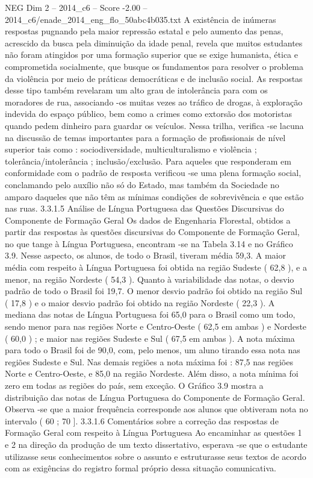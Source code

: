 \begin{textsample}{NEG Dim 2 – 2014\_c6 – Score -2.00 – 2014\_c6/enade\_2014\_eng\_flo\_50abc4b035.txt}
A existência de inúmeras respostas pugnando pela maior repressão estatal e pelo aumento das penas, acrescido da busca pela diminuição da idade penal, revela que muitos estudantes não foram atingidos por uma formação superior que se exige humanista, ética e comprometida socialmente, que busque os fundamentos para resolver o problema da violência por meio de práticas democráticas e de inclusão social.
As respostas desse tipo também revelaram um alto grau de intolerância para com os moradores de rua, associando -os muitas vezes ao tráfico de drogas, à exploração indevida do espaço público, bem como a crimes como extorsão dos motoristas quando pedem dinheiro para guardar os veículos.
Nessa trilha, verifica -se lacuna na discussão de temas importantes para a formação de profissionais de nível superior tais como : sociodiversidade, multiculturalismo e violência ; tolerância/intolerância ; inclusão/exclusão.
Para aqueles que responderam em conformidade com o padrão de resposta verificou -se uma plena formação social, conclamando pelo auxílio não só do Estado, mas também da Sociedade no amparo daqueles que não têm as mínimas condições de sobrevivência e que estão nas ruas. 3.3.1.5 Análise de Língua Portuguesa das Questões Discursivas do Componente de Formação Geral Os dados de Engenharia Florestal, obtidos a partir das respostas às questões discursivas do Componente de Formação Geral, no que tange à Língua Portuguesa, encontram -se na Tabela 3.14 e no Gráfico 3.9.
Nesse aspecto, os alunos, de todo o Brasil, tiveram média 59,3.
A maior média com respeito à Língua Portuguesa foi obtida na região Sudeste ( 62,8 ), e a menor, na região Nordeste ( 54,3 ).
Quanto à variabilidade das notas, o desvio padrão de todo o Brasil foi 19,7.
O menor desvio padrão foi obtido na região Sul ( 17,8 ) e o maior desvio padrão foi obtido na região Nordeste ( 22,3 ).
A mediana das notas de Língua Portuguesa foi 65,0 para o Brasil como um todo, sendo menor para nas regiões Norte e Centro-Oeste ( 62,5 em ambas ) e Nordeste ( 60,0 ) ; e maior nas regiões Sudeste e Sul ( 67,5 em ambas ).
A nota máxima para todo o Brasil foi de 90,0, com, pelo menos, um aluno tirando essa nota nas regiões Sudeste e Sul.
Nas demais regiões a nota máxima foi : 87,5 nas regiões Norte e Centro-Oeste, e 85,0 na região Nordeste.
Além disso, a nota mínima foi zero em todas as regiões do país, sem exceção.
O Gráfico 3.9 mostra a distribuição das notas de Língua Portuguesa do Componente de Formação Geral.
Observa -se que a maior frequência corresponde aos alunos que obtiveram nota no intervalo ( 60 ; 70 ]. 3.3.1.6 Comentários sobre a correção das respostas de Formação Geral com respeito à Língua Portuguesa Ao encaminhar as questões 1 e 2 na direção da produção de um texto dissertativo, esperava -se que o estudante utilizasse seus conhecimentos sobre o assunto e estruturasse seus textos de acordo com as exigências do registro formal próprio dessa situação comunicativa.

\end{textsample}
